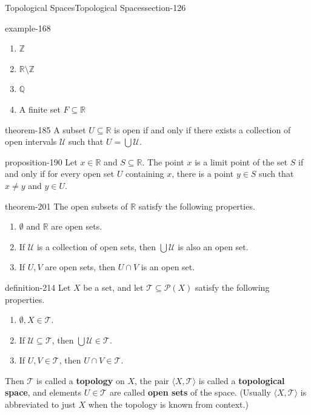 \documentclass[oneside,10pt,]{article}
\newcommand{\terminology}[1]{\textbf{#1}}
\newcommand{\tuple}[1]{\langle #1 \rangle}
\newcommand{\mb}{\mathbb}
\newcommand{\mc}{\mathcal}
\begin{document}
\begin{sectionptx}{Topological Spaces}{}{Topological Spaces}{}{}{section-126}
\begin{example}{}{example-168}
\begin{enumerate}
\item\hypertarget{li-177}{}\(\mb Z\)%
\item\hypertarget{li-179}{}\(\mb R\setminus\mb Z\)%
\item\hypertarget{li-181}{}\(\mb Q\)%
\item\hypertarget{li-183}{}A finite set \(F\subseteq\mb R\)%
\end{enumerate}
\end{example}
\begin{theorem}{}{}{theorem-185}%
\hypertarget{p-186}{}%
A subset \(U\subseteq\mb R\) is open if and only if there exists a collection of open intervals \(\mc U\) such that \(U=\bigcup\mc U\).%
\end{theorem}
\begin{proposition}{}{}{proposition-190}%
\hypertarget{p-191}{}%
Let \(x\in\mb R\) and \(S\subseteq\mb R\). The point \(x\) is a limit point of the set \(S\) if and only if for every open set \(U\) containing \(x\), there is a point \(y\in S\) such that \(x\not=y\) and \(y\in U\).%
\end{proposition}
\begin{theorem}{}{}{theorem-201}%
\hypertarget{p-202}{}%
The open subsets of \(\mb R\) satisfy the following properties.%
\leavevmode%
\begin{enumerate}
\item\hypertarget{li-205}{}\(\emptyset\) and \(\mb R\) are open sets.%
\item\hypertarget{li-208}{}If \(\mc U\) is a collection of open sets, then \(\bigcup\mc U\) is also an open set.%
\item\hypertarget{li-211}{}If \(U,V\) are open sets, then \(U\cap V\) is an open set.%
\end{enumerate}
\end{theorem}
\begin{definition}{}{definition-214}%
\hypertarget{p-215}{}%
Let \(X\) be a set, and let \(\mc T\subseteq \mc P(X)\) satisfy the following properties.%
\leavevmode%
\begin{enumerate}
\item\hypertarget{li-219}{}\(\emptyset,X\in\mc T\).%
\item\hypertarget{li-221}{}If \(\mc U\subseteq\mc T\), then \(\bigcup\mc U\in\mc T\).%
\item\hypertarget{li-224}{}If \(U,V\in\mc T\), then \(U\cap V\in\mc T\).%
\end{enumerate}
\hypertarget{p-227}{}%
Then \(\mc T\) is called a \terminology{topology} on \(X\), the pair \(\tuple{X,\mc T}\) is called a \terminology{topological space}, and elements \(U\in\mc T\) are called \terminology{open sets} of the space. (Usually \(\tuple{X,\mc T}\) is abbreviated to just \(X\) when the topology is known from context.)%

\end{definition}
\end{sectionptx}
\end{document}
